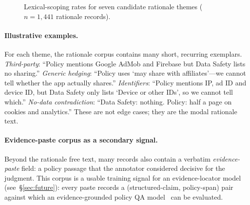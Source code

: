 \documentclass[11pt,a4paper]{article}
\begin{document}
\begin{figure}[t]
\centering
{}
\caption{Lexical-scoping rates for seven candidate rationale themes
($n=1{,}441$ rationale records).}
\label{fig:themes}
\end{figure}

\paragraph{Illustrative examples.}
For each theme, the rationale corpus contains many short, recurring
exemplars. \emph{Third-party}: ``Policy mentions Google AdMob and
Firebase but Data Safety lists no sharing.'' \emph{Generic hedging}:
``Policy uses `may share with affiliates'---we cannot tell whether
the app actually shares.'' \emph{Identifiers}: ``Policy mentions IP,
ad ID and device ID, but Data Safety only lists `Device or other
IDs', so we cannot tell which.'' \emph{No-data contradiction}:
``Data Safety: nothing. Policy: half a page on cookies and analytics.''
These are not edge cases; they are the modal rationale text.

\paragraph{Evidence-paste corpus as a secondary signal.}
Beyond the rationale free text, many records also contain a verbatim
\emph{evidence-paste} field: a policy passage that the annotator
considered decisive for the judgment. This corpus is a usable
training signal for an evidence-locator model
(see~\S\ref{sec:future}): every paste records a (structured-claim,
policy-span) pair against which an evidence-grounded policy QA
model~\citep{ravichander2019question,ahmad2021intent} can be evaluated.
\end{document}
